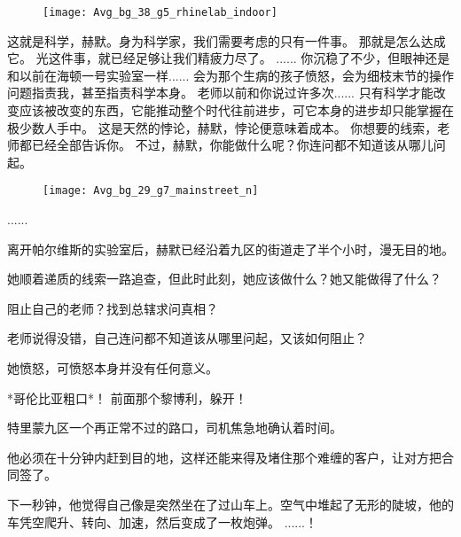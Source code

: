 \documentclass[openany]{book}
\begin{document}
\begin{figure}[h]
    \centering
    \texttt{[image: Avg\_bg\_38\_g5\_rhinelab\_indoor]}
\end{figure}
\begin{dialogue}
     这就是科学，赫默。身为科学家，我们需要考虑的只有一件事。
     那就是怎么达成它。
     光这件事，就已经足够让我们精疲力尽了。
     ......
     你沉稳了不少，但眼神还是和以前在海顿一号实验室一样......
     会为那个生病的孩子愤怒，会为细枝末节的操作问题指责我，甚至指责科学本身。
     老师以前和你说过许多次......
     只有科学才能改变应该被改变的东西，它能推动整个时代往前进步，可它本身的进步却只能掌握在极少数人手中。
     这是天然的悖论，赫默，悖论便意味着成本。
     你想要的线索，老师都已经全部告诉你。
     不过，赫默，你能做什么呢？你连问都不知道该从哪儿问起。
\end{dialogue}

\begin{figure}[h]
    \centering
    \texttt{[image: Avg\_bg\_29\_g7\_mainstreet\_n]}
\end{figure}
\begin{dialogue}
     ......
\end{dialogue}
\par
离开帕尔维斯的实验室后，赫默已经沿着九区的街道走了半个小时，漫无目的地。\par
她顺着递质的线索一路追查，但此时此刻，她应该做什么？她又能做得了什么？\par
阻止自己的老师？找到总辖求问真相？\par
老师说得没错，自己连问都不知道该从哪里问起，又该如何阻止？\par
她愤怒，可愤怒本身并没有任何意义。

\begin{dialogue}
     *哥伦比亚粗口*！
     前面那个黎博利，躲开！\par
    特里蒙九区一个再正常不过的路口，司机焦急地确认着时间。\par
    他必须在十分钟内赶到目的地，这样还能来得及堵住那个难缠的客户，让对方把合同签了。\par
    下一秒钟，他觉得自己像是突然坐在了过山车上。空气中堆起了无形的陡坡，他的车凭空爬升、转向、加速，然后变成了一枚炮弹。
     ......！
\end{dialogue}
\end{document}
